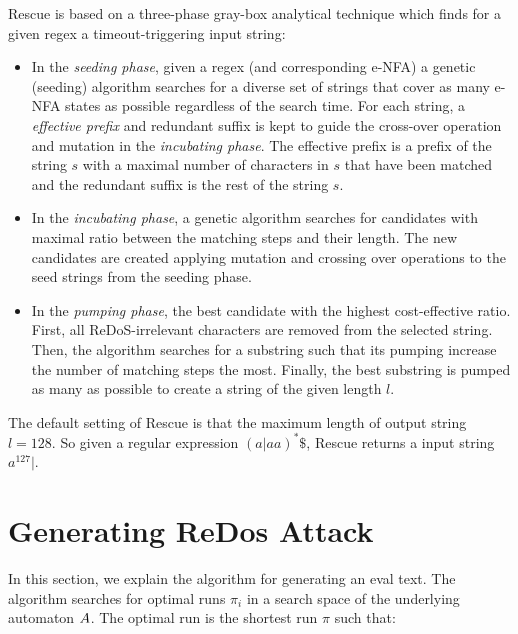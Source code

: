 \documentclass[acmsmall,screen]{acmart}
\begin{document}
%
Rescue is based on a three-phase gray-box analytical technique
which finds for a given regex a timeout-triggering input string:
%
\begin{itemize}
\item In the \emph{seeding phase}, given a regex (and corresponding e-NFA) a genetic (seeding) algorithm searches for a diverse set of strings that cover as many e-NFA states as possible regardless of the search time.
%
For each string, a \emph{effective prefix} and redundant suffix is kept to guide the cross-over operation and mutation in the \emph{incubating phase}.
%
The effective prefix is a prefix of the string $s$ with a maximal number of characters in $s$ that have been matched and the redundant suffix is the rest of the string $s$.

%
\item In the \emph{incubating phase}, a genetic algorithm searches for candidates with maximal ratio between the matching steps and their length. The new candidates are created applying mutation and crossing over operations to the seed strings from the seeding phase.
\item In the \emph{pumping phase}, the best candidate with the highest cost-effective ratio. First, all  ReDoS-irrelevant characters are removed from the selected string. Then, the algorithm searches for a substring such that its pumping increase the number of matching steps the most. Finally, the best substring is pumped as many as possible to create a string of the given length $l$.
\end{itemize}

\begin{example}
The default setting of Rescue is that the maximum length of output string $l = 128$. So given a regular expression $(a|aa)^*\$$, Rescue returns a input string $a^{127}|$.
\end{example}



\section{Generating ReDos Attack}\label{sec:genText}
In this section, we explain the algorithm for generating an eval text. The algorithm searches for optimal runs $\pi_i$ in a search space of the underlying automaton $A$. The optimal run is the shortest run $\pi$ such that:
\end{document}
